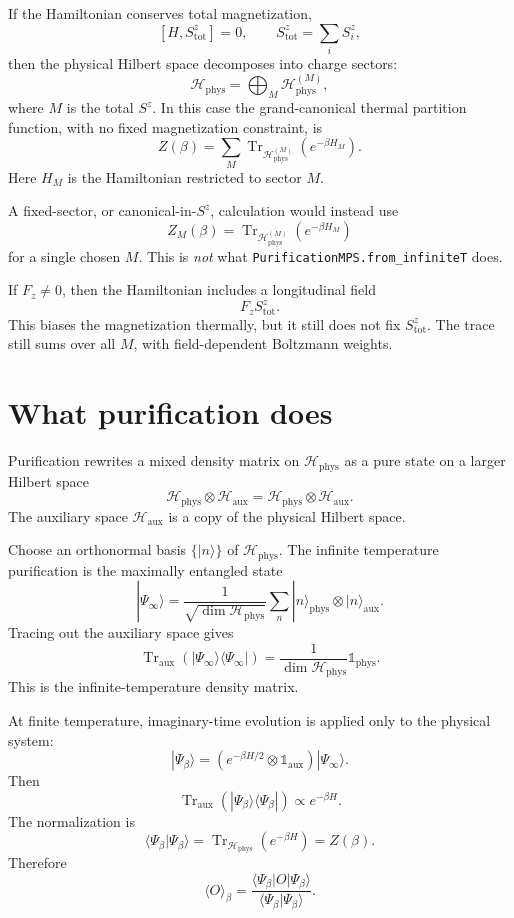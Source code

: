 \documentclass[11pt]{article}
\newcommand{\Tr}{\operatorname{Tr}}
\newcommand{\Id}{\mathbb{1}}
\newcommand{\Hphys}{\mathcal{H}_{\mathrm{phys}}}
\newcommand{\Haux}{\mathcal{H}_{\mathrm{aux}}}
\newcommand{\Htot}{\mathcal{H}_{\mathrm{phys}}\otimes\mathcal{H}_{\mathrm{aux}}}
\begin{document}
If the Hamiltonian conserves total magnetization,
\[
\left[H, S^z_{\mathrm{tot}}\right]=0,
\qquad
S^z_{\mathrm{tot}} = \sum_i S_i^z,
\]
then the physical Hilbert space decomposes into charge sectors:
\[
\Hphys = \bigoplus_M \Hphys^{(M)},
\]
where \(M\) is the total \(S^z\). In this case the grand-canonical thermal
partition function, with no fixed magnetization constraint, is
\[
Z(\beta)
= \sum_M \Tr_{\Hphys^{(M)}}\left(e^{-\beta H_M}\right).
\]
Here \(H_M\) is the Hamiltonian restricted to sector \(M\).

A fixed-sector, or canonical-in-\(S^z\), calculation would instead use
\[
Z_M(\beta)
= \Tr_{\Hphys^{(M)}}\left(e^{-\beta H_M}\right)
\]
for a single chosen \(M\). This is \emph{not} what
\texttt{PurificationMPS.from\_infiniteT} does.

If \(F_z\neq 0\), then the Hamiltonian includes a longitudinal field
\[
F_z S^z_{\mathrm{tot}}.
\]
This biases the magnetization thermally, but it still does not fix
\(S^z_{\mathrm{tot}}\). The trace still sums over all \(M\), with field-dependent
Boltzmann weights.

\section{What purification does}

Purification rewrites a mixed density matrix on \(\Hphys\) as a pure state on a
larger Hilbert space
\[
\Htot = \Hphys \otimes \Haux.
\]
The auxiliary space \(\Haux\) is a copy of the physical Hilbert space.

Choose an orthonormal basis \(\{|n\rangle\}\) of \(\Hphys\). The infinite
temperature purification is the maximally entangled state
\[
|\Psi_{\infty}\rangle
= \frac{1}{\sqrt{\dim \Hphys}}
  \sum_n |n\rangle_{\mathrm{phys}}\otimes |n\rangle_{\mathrm{aux}}.
\]
Tracing out the auxiliary space gives
\[
\Tr_{\mathrm{aux}}\left(|\Psi_{\infty}\rangle\langle\Psi_{\infty}|\right)
= \frac{1}{\dim\Hphys}\Id_{\mathrm{phys}}.
\]
This is the infinite-temperature density matrix.

At finite temperature, imaginary-time evolution is applied only to the physical
system:
\[
|\Psi_\beta\rangle
= \left(e^{-\beta H/2}\otimes \Id_{\mathrm{aux}}\right)
|\Psi_{\infty}\rangle.
\]
Then
\[
\Tr_{\mathrm{aux}}\left(|\Psi_\beta\rangle\langle\Psi_\beta|\right)
\propto e^{-\beta H}.
\]
The normalization is
\[
\langle \Psi_\beta|\Psi_\beta\rangle
= \Tr_{\Hphys}\left(e^{-\beta H}\right)
= Z(\beta).
\]
Therefore
\[
\langle O\rangle_\beta
=
\frac{\langle\Psi_\beta|O|\Psi_\beta\rangle}
     {\langle\Psi_\beta|\Psi_\beta\rangle}.
\]
\end{document}
